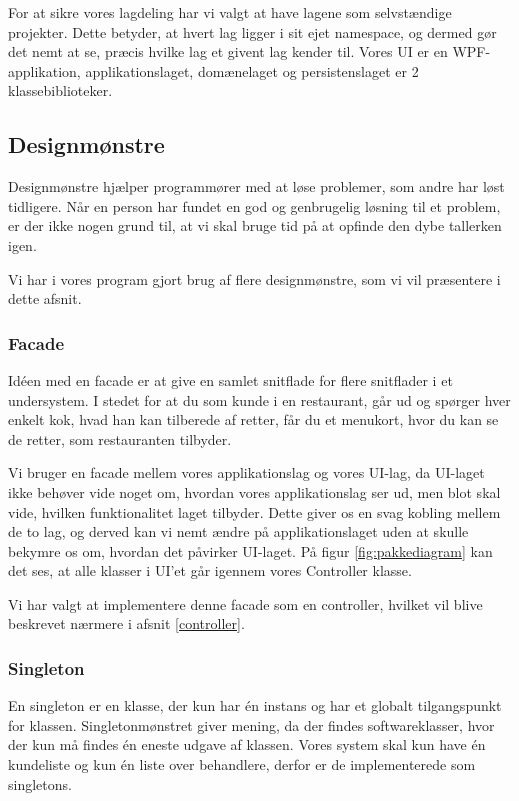 For at sikre vores lagdeling har vi valgt at have lagene som selvstændige projekter.
Dette betyder, at hvert lag ligger i sit ejet namespace, og dermed gør det nemt at se, præcis hvilke lag et givent lag kender til.
Vores UI er en WPF-applikation, applikationslaget, domænelaget og persistenslaget er 2 klassebiblioteker.

\subsection{Designmønstre}
\label{designmoenstre}
Designmønstre hjælper programmører med at løse problemer, som andre har løst tidligere.
Når en person har fundet en god og genbrugelig løsning til et problem, er der ikke nogen grund til, at vi skal bruge tid på at opfinde den dybe tallerken igen.

Vi har i vores program gjort brug af flere designmønstre, som vi vil præsentere i dette afsnit.

\subsubsection{Facade}
\label{facade}

Idéen med en facade er at give en samlet snitflade for flere snitflader i et undersystem.
I stedet for at du som kunde i en restaurant, går ud og spørger hver enkelt kok, hvad han kan tilberede af retter, får du et menukort, hvor du kan se de retter, som restauranten tilbyder.

Vi bruger en facade mellem vores applikationslag og vores UI-lag, da UI-laget ikke behøver vide noget om, hvordan vores applikationslag ser ud, men blot skal vide, hvilken funktionalitet laget tilbyder.
Dette giver os en svag kobling mellem de to lag, og derved kan vi nemt ændre på applikationslaget uden at skulle bekymre os om, hvordan det påvirker UI-laget.\cite{gangoffour}
På figur \ref{fig:pakkediagram} kan det ses, at alle klasser i UI'et går igennem vores Controller klasse.

Vi har valgt at implementere denne facade som en controller, hvilket vil blive beskrevet nærmere i afsnit \ref{controller}.

\subsubsection{Singleton}
\label{singleton}

En singleton er en klasse, der kun har én instans og har et globalt tilgangspunkt for klassen.
Singletonmønstret giver mening, da der findes softwareklasser, hvor der kun må findes én eneste udgave af klassen.
Vores system skal kun have én kundeliste og kun én liste over behandlere, derfor er de implementerede som singletons.

